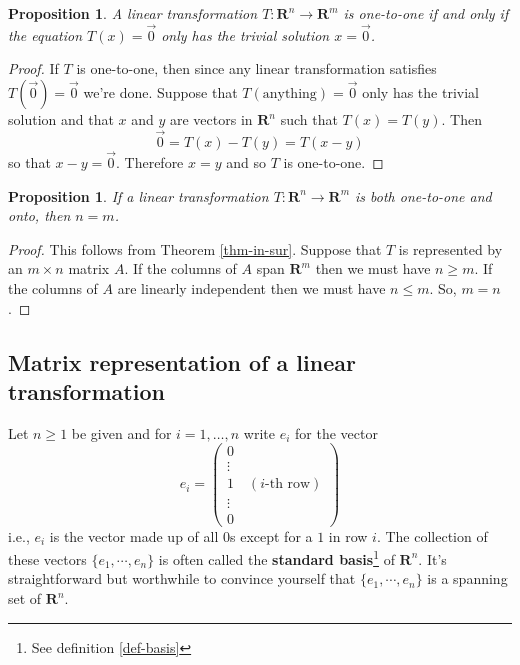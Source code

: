 \documentclass[12pt]{article}
\numberwithin{equation}{subsection}
\numberwithin{figure}{subsection}
\newtheorem{prop}[subsection]{Proposition}
\theoremstyle{note}
\begin{document}
\begin{prop} \label{thm-kernel}
	A linear transformation $T\colon \mathbf{R}^n\to\mathbf{R}^m$ is one-to-one if and only if the equation $T(x)=\vec{0}$ only has the trivial solution $x=\vec{0}$. 
\end{prop}

\begin{proof}
If $T$ is one-to-one, then since any linear transformation satisfies $T(\vec{0})=\vec{0}$ we're done. Suppose that $T( \text{anything} )=\vec{0}$ only has the trivial solution and that $x$ and $y$ are vectors in $\mathbf{R}^n$ such that $T(x)=T(y)$. Then \[ \vec{0}=T(x)-T(y)=T(x-y)\] so that $x-y=\vec{0}$. Therefore $x=y$ and so $T$ is one-to-one. 
\end{proof}

\begin{prop}
	If a linear transformation $T\colon \mathbf{R}^n\to\mathbf{R}^m$ is both one-to-one and onto, then $n=m$. 
\end{prop}
\begin{proof}
	This follows from Theorem \ref{thm-in-sur}. Suppose that $T$ is represented by an $m\times n$ matrix $A$. If the columns of $A$ span $\mathbf{R}^m$ then we must have $n\geq m$. If the columns of $A$ are linearly independent then we must have $n\leq m$. So, $m=n$.
\end{proof}
\subsection{Matrix representation of a linear transformation}
Let $n\geq 1$ be given and for $i=1,\dots,n$ write $e_i$ for the vector \begin{equation} e_i=\begin{pmatrix} 0  \\ \vdots \\ 1 \quad (\text{$i$-th row}) \\ \vdots \\ 0 \end{pmatrix}\end{equation} i.e., $e_i$ is the vector made up of all $0$s except for a $1$ in row $i$. The collection of these vectors $\{e_1,\cdots,e_n\}$ is often called the \textbf{standard basis}\footnote{See definition \ref{def-basis}} of $\mathbf{R}^n$. It's straightforward but worthwhile to convince yourself that $\{e_1,\cdots,e_n\}$ is a spanning set of $\mathbf{R}^n$.
\end{document}

